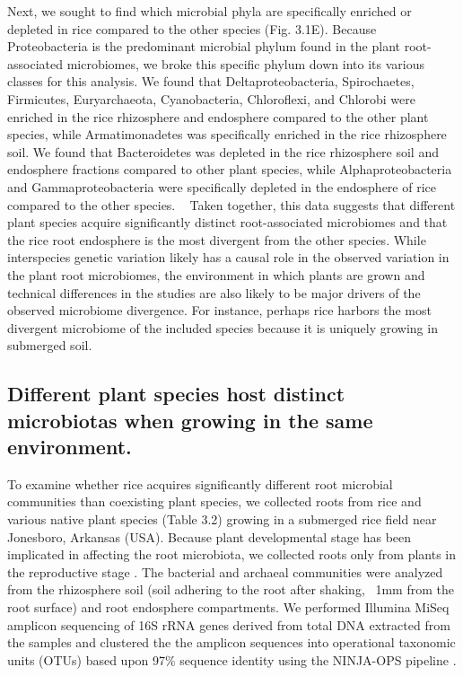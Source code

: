Next, we sought to find which microbial phyla are specifically enriched or depleted in rice compared to the other species (Fig. 3.1E). Because Proteobacteria is the predominant microbial phylum found in the plant root-associated microbiomes, we broke this specific phylum down into its various classes for this analysis. We found that Deltaproteobacteria, Spirochaetes, Firmicutes, Euryarchaeota, Cyanobacteria, Chloroflexi, and Chlorobi were enriched in the rice rhizosphere and endosphere compared to the other plant species, while Armatimonadetes was specifically enriched in the rice rhizosphere soil. We found that Bacteroidetes was depleted in the rice rhizosphere soil and endosphere fractions compared to other plant species, while Alphaproteobacteria and Gammaproteobacteria were specifically depleted in the endosphere of rice compared to the other species.  
Taken together, this data suggests that different plant species acquire significantly distinct root-associated microbiomes and that the rice root endosphere is the most divergent from the other species. While interspecies genetic variation likely has a causal role in the observed variation in the plant root microbiomes, the environment in which plants are grown and technical differences in the studies are also likely to be major drivers of the observed microbiome divergence. For instance, perhaps rice harbors the most divergent microbiome of the included species because it is uniquely growing in submerged soil.


\subsection{Different plant species host distinct microbiotas when growing in the same environment. }
To examine whether rice acquires significantly different root microbial communities than coexisting plant species, we collected roots from rice and various native plant species (Table 3.2) growing in a submerged rice field near Jonesboro, Arkansas (USA). Because plant developmental stage has been implicated in affecting the root microbiota, we collected roots only from plants in the reproductive stage \cite{Lundberg2012}. The bacterial and archaeal communities were analyzed from the rhizosphere soil (soil adhering to the root after shaking, ~1mm from the root surface) and root endosphere compartments. We performed Illumina MiSeq amplicon sequencing of 16S rRNA genes derived from total DNA extracted from the samples and clustered the the amplicon sequences into operational taxonomic units (OTUs) based upon 97\% sequence identity using the NINJA-OPS pipeline \cite{Al-Ghalith2016}.

